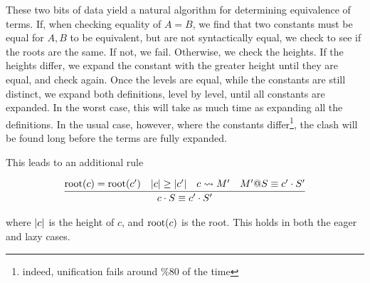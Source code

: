 These two bits of data yield a natural algorithm for determining 
equivalence of terms.  If, when checking equality of $A=B$,
we find that two constants must be equal for $A,B$ to
be equivalent, but are not syntactically equal, 
we check to see if the roots are the same.
If not, we fail.  Otherwise, we check the heights.  If the heights
differ, we expand the constant with the greater height until 
they are equal, and check again.  Once the levels
are equal, while the constants are still distinct, we 
expand both definitions, level by level, until all constants
are expanded.  In the worst case, this will take as much time
as expanding all the definitions.  In the usual case, however,
where the constants differ\footnote{indeed, unification fails
around \%80 of the time}, the clash will be found long before
the terms are fully expanded.  

This leads to an additional rule 

$$
\begin{array}{cccc}
\infer{\Equiv{c\cdot S}{c'\cdot S'}}{\Root(c)=\Root(c') & \Card{c} \geq \Card{c'} & c\StepsTo M' & \Equiv{M'@S}{c'\cdot S'}} 
\end{array} 
$$

where $\left|c\right|$ is the height of $c$, and $\mbox{root}(c)$ is the root.
This holds in both the eager and lazy cases.
